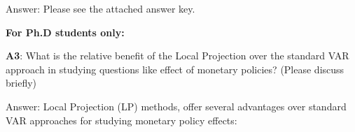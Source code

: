 Answer: Please see the attached answer key.




\vspace{0.5cm}
\textbf{For Ph.D students only:}


\textbf{A3}: What is the relative benefit of the Local Projection  over the standard VAR approach in studying questions like  effect of monetary policies? (Please discuss briefly) 


Answer: Local Projection (LP) methods, offer several advantages over standard VAR approaches for studying monetary policy effects:
 
